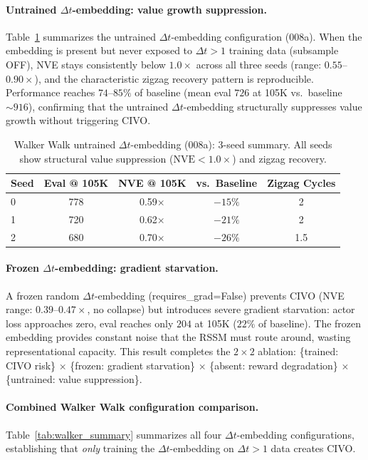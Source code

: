 \documentclass[10pt,letterpaper]{article}
\newcommand{\dt}{\Delta t}
\newcommand{\nve}{\mathrm{NVE}}
\begin{document}
\paragraph{Untrained $\dt$-embedding: value growth suppression.}
Table~\ref{tab:walker_untrained} summarizes the untrained $\dt$-embedding configuration (008a).
When the embedding is present but never exposed to $\dt{>}1$ training data (subsample OFF), NVE stays consistently below $1.0\times$ across all three seeds (range: $0.55$--$0.90\times$), and the characteristic zigzag recovery pattern is reproducible.
Performance reaches $74$--$85\%$ of baseline (mean eval $726$ at 105K vs.\ baseline ${\sim}916$), confirming that the untrained $\dt$-embedding structurally suppresses value growth without triggering CIVO.

\begin{table}[h]
\centering
\caption{Walker Walk untrained $\dt$-embedding (008a): 3-seed summary. All seeds show structural value suppression ($\nve < 1.0\times$) and zigzag recovery.}
\label{tab:walker_untrained}
\small
\begin{tabular}{lcccc}
\toprule
Seed & Eval @ 105K & NVE @ 105K & vs.\ Baseline & Zigzag Cycles \\
\midrule
0 & 778 & 0.59$\times$ & $-15\%$ & 2 \\
1 & 720 & 0.62$\times$ & $-21\%$ & 2 \\
2 & 680 & 0.70$\times$ & $-26\%$ & 1.5 \\
\bottomrule
\end{tabular}
\end{table}

\paragraph{Frozen $\dt$-embedding: gradient starvation.}
A frozen random $\dt$-embedding (requires\_grad=False) prevents CIVO (NVE range: $0.39$--$0.47\times$, no collapse) but introduces severe gradient starvation: actor loss approaches zero, eval reaches only $204$ at 105K ($22\%$ of baseline).
The frozen embedding provides constant noise that the RSSM must route around, wasting representational capacity.
This result completes the $2{\times}2$ ablation: \{trained: CIVO risk\} $\times$ \{frozen: gradient starvation\} $\times$ \{absent: reward degradation\} $\times$ \{untrained: value suppression\}.

\paragraph{Combined Walker Walk configuration comparison.}
Table~\ref{tab:walker_summary} summarizes all four $\dt$-embedding configurations, establishing that \emph{only} training the $\dt$-embedding on $\dt{>}1$ data creates CIVO.
\end{document}
